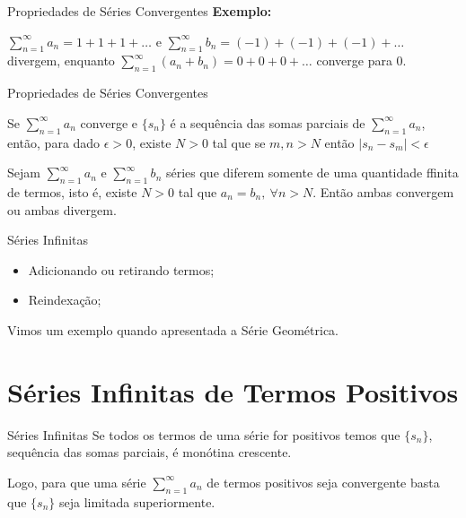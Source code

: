 \documentclass[hyperref={pdfpagelabels=false}]{beamer}
\begin{document}
\begin{frame}{Propriedades de Séries Convergentes}
    {\bf Exemplo:}
    
    $\displaystyle \sum_{n=1}^{\infty}a_n = 1 + 1 + 1 + \dots $ e $\displaystyle \sum_{n=1}^{\infty}b_n = (-1) + (-1) + (-1) + \dots$ divergem, enquanto $\displaystyle \sum_{n=1}^{\infty}(a_n + b_n) = 0 + 0 + 0 + \dots $ converge para 0.
\end{frame}

\begin{frame}{Propriedades de Séries Convergentes}
    \begin{theorem}
        Se $\displaystyle \sum_{n=1}^{\infty}a_n$ converge e $\{s_n\}$ é a sequência das somas parciais de $\displaystyle \sum_{n=1}^{\infty}a_n$, então, para dado $\epsilon > 0$, existe $N>0$ tal que se $m,n > N$ então $|s_n - s_m| < \epsilon$
    \end{theorem} \pause
    
    \begin{theorem}
        Sejam $\displaystyle \sum_{n=1}^{\infty}a_n$ e $\displaystyle \sum_{n=1}^{\infty}b_n$ séries que diferem somente de uma quantidade ffinita de termos, isto é, existe $N>0$ tal que $a_n = b_n,~ \forall n>N$. Então ambas convergem ou ambas divergem.
    \end{theorem}

\end{frame}


\begin{frame}{Séries Infinitas}
    \begin{itemize}
        \item Adicionando ou retirando termos; \pause
        \item Reindexação; \pause
    \end{itemize}
    Vimos um exemplo quando apresentada a Série Geométrica.
\end{frame}

\section{Séries Infinitas de Termos Positivos}

\begin{frame}{Séries Infinitas}
    Se todos os termos de uma série for positivos temos que $\{s_n\}$, sequência das somas parciais, é monótina crescente. \pause
    
    Logo, para que uma série $\displaystyle \sum_{n=1}^{\infty}a_n$ de termos positivos seja convergente basta que $\{ s_n\}$ seja limitada superiormente.
\end{frame}
\end{document}
